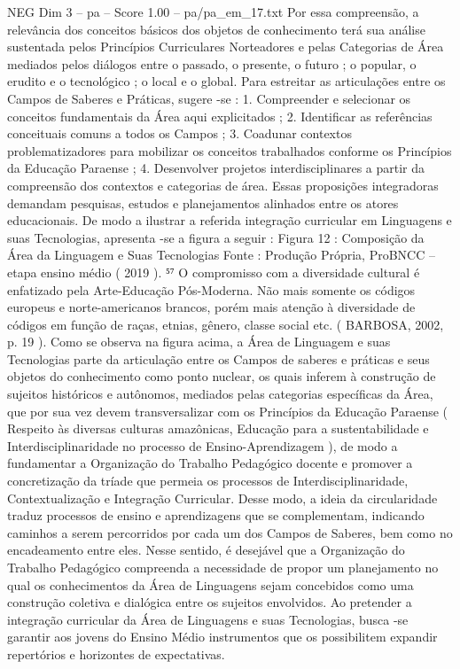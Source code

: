 \begin{textsample}{NEG Dim 3 – pa – Score 1.00 – pa/pa\_em\_17.txt}
Por essa compreensão, a relevância dos conceitos básicos dos objetos de conhecimento terá sua análise sustentada pelos Princípios Curriculares Norteadores e pelas Categorias de Área mediados pelos diálogos entre o passado, o presente, o futuro ; o popular, o erudito e o tecnológico ; o local e o global.
Para estreitar as articulações entre os Campos de Saberes e Práticas, sugere -se : 1.
Compreender e selecionar os conceitos fundamentais da Área aqui explicitados ; 2.
Identificar as referências conceituais comuns a todos os Campos ; 3.
Coadunar contextos problematizadores para mobilizar os conceitos trabalhados conforme os Princípios da Educação Paraense ; 4.
Desenvolver projetos interdisciplinares a partir da compreensão dos contextos e categorias de área.
Essas proposições integradoras demandam pesquisas, estudos e planejamentos alinhados entre os atores educacionais.
De modo a ilustrar a referida integração curricular em Linguagens e suas Tecnologias, apresenta -se a figura a seguir : Figura 12 : Composição da Área da Linguagem e Suas Tecnologias Fonte : Produção Própria, ProBNCC – etapa ensino médio ( 2019 ). ⁵⁷ O compromisso com a diversidade cultural é enfatizado pela Arte-Educação Pós-Moderna.
Não mais somente os códigos europeus e norte-americanos brancos, porém mais atenção à diversidade de códigos em função de raças, etnias, gênero, classe social etc. ( BARBOSA, 2002, p. 19 ).
Como se observa na figura acima, a Área de Linguagem e suas Tecnologias parte da articulação entre os Campos de saberes e práticas e seus objetos do conhecimento como ponto nuclear, os quais inferem à construção de sujeitos históricos e autônomos, mediados pelas categorias específicas da Área, que por sua vez devem transversalizar com os Princípios da Educação Paraense ( Respeito às diversas culturas amazônicas, Educação para a sustentabilidade e Interdisciplinaridade no processo de Ensino-Aprendizagem ), de modo a fundamentar a Organização do Trabalho Pedagógico docente e promover a concretização da tríade que permeia os processos de Interdisciplinaridade, Contextualização e Integração Curricular.
Desse modo, a ideia da circularidade traduz processos de ensino e aprendizagens que se complementam, indicando caminhos a serem percorridos por cada um dos Campos de Saberes, bem como no encadeamento entre eles.
Nesse sentido, é desejável que a Organização do Trabalho Pedagógico compreenda a necessidade de propor um planejamento no qual os conhecimentos da Área de Linguagens sejam concebidos como uma construção coletiva e dialógica entre os sujeitos envolvidos.
Ao pretender a integração curricular da Área de Linguagens e suas Tecnologias, busca -se garantir aos jovens do Ensino Médio instrumentos que os possibilitem expandir repertórios e horizontes de expectativas.

\end{textsample}
